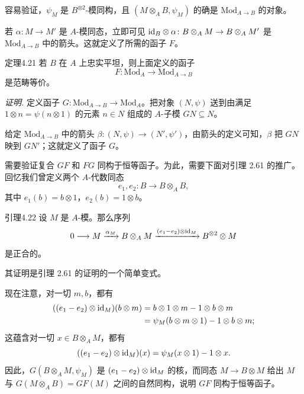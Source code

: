 容易验证，$\psi_M$ 是 $B^{\otimes2}$-模同构，且 $(M\otimes_A B,\psi_M)$ 的确是 $\mathrm{Mod}_{A\to B}$ 的对象。

若 $\alpha\colon M\to M'$ 是 $A$-模同态，立即可见 $\mathrm{id}_B\otimes\alpha\colon B\otimes_A M\to B\otimes_A M'$ 是 $\mathrm{Mod}_{A\to B}$ 中的箭头。这就定义了所需的函子 $F$。

\begin{origstatement}{定理}{4.21}\label{ch04:thm421}
若 $B$ 在 $A$ 上忠实平坦，则上面定义的函子
\[
 F\colon\mathrm{Mod}_A\longrightarrow\mathrm{Mod}_{A\to B}
\]
是范畴等价。
\end{origstatement}
\noindent\textit{证明.}
定义函子 $G\colon\mathrm{Mod}_{A\to B}\to\mathrm{Mod}_A$。把对象 $(N,\psi)$ 送到由满足 $1\otimes n=\psi(n\otimes1)$ 的元素 $n\in N$ 组成的 $A$-子模 $GN\subseteq N$。

给定 $\mathrm{Mod}_{A\to B}$ 中的箭头 $\beta\colon(N,\psi)\to(N',\psi')$，由箭头的定义可知，$\beta$ 把 $GN$ 映到 $GN'$；这就定义了函子 $G$。

需要验证复合 $GF$ 和 $FG$ 同构于恒等函子。为此，需要下面对引理 2.61 的推广。回忆我们曾定义两个 $A$-代数同态
\[
 e_1,e_2\colon B\longrightarrow B\otimes_A B,
\]
其中 $e_1(b)=b\otimes1$，$e_2(b)=1\otimes b$。

\begin{origstatement}{引理}{4.22}\label{ch04:lem422}
设 $M$ 是 $A$-模。那么序列
\[
 0\longrightarrow M\xrightarrow{\alpha_M}B\otimes_A M
 \xrightarrow{(e_1-e_2)\otimes\mathrm{id}_M}B^{\otimes2}\otimes M
\]
是正合的。
\end{origstatement}
其证明是引理 2.61 的证明的一个简单变式。

现在注意，对一切 $m,b$，都有
\[
\begin{aligned}
 ((e_1-e_2)\otimes\mathrm{id}_M)(b\otimes m)
 &=b\otimes1\otimes m-1\otimes b\otimes m\\
 &=\psi_M(b\otimes m\otimes1)-1\otimes b\otimes m;
\end{aligned}
\]
这蕴含对一切 $x\in B\otimes_A M$，都有
\[
 ((e_1-e_2)\otimes\mathrm{id}_M)(x)=\psi_M(x\otimes1)-1\otimes x.
\]
因此，$G(B\otimes_A M,\psi_M)$ 是 $(e_1-e_2)\otimes\mathrm{id}_M$ 的核，而同态 $M\to B\otimes M$ 给出 $M$ 与 $G(M\otimes_A B)=GF(M)$ 之间的自然同构，说明 $GF$ 同构于恒等函子。

